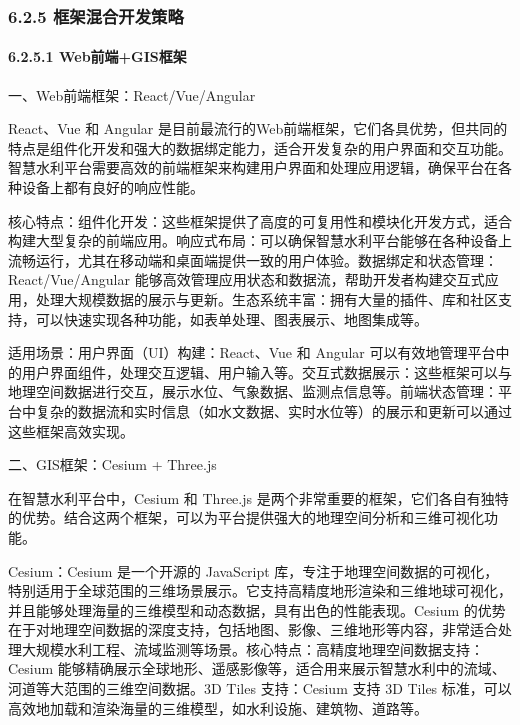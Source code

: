 \hypertarget{ux6846ux67b6ux6df7ux5408ux5f00ux53d1ux7b56ux7565}{%
\subsubsection{6.2.5 框架混合开发策略}\label{ux6846ux67b6ux6df7ux5408ux5f00ux53d1ux7b56ux7565}}

\hypertarget{webux524dux7aefgisux6846ux67b6}{%
\paragraph{6.2.5.1 Web前端+GIS框架}\label{webux524dux7aefgisux6846ux67b6}}

一、Web前端框架：React/Vue/Angular

React、Vue 和 Angular 是目前最流行的Web前端框架，它们各具优势，但共同的特点是组件化开发和强大的数据绑定能力，适合开发复杂的用户界面和交互功能。智慧水利平台需要高效的前端框架来构建用户界面和处理应用逻辑，确保平台在各种设备上都有良好的响应性能。

核心特点：组件化开发：这些框架提供了高度的可复用性和模块化开发方式，适合构建大型复杂的前端应用。响应式布局：可以确保智慧水利平台能够在各种设备上流畅运行，尤其在移动端和桌面端提供一致的用户体验。数据绑定和状态管理：React/Vue/Angular 能够高效管理应用状态和数据流，帮助开发者构建交互式应用，处理大规模数据的展示与更新。生态系统丰富：拥有大量的插件、库和社区支持，可以快速实现各种功能，如表单处理、图表展示、地图集成等。

适用场景：用户界面（UI）构建：React、Vue 和 Angular 可以有效地管理平台中的用户界面组件，处理交互逻辑、用户输入等。交互式数据展示：这些框架可以与地理空间数据进行交互，展示水位、气象数据、监测点信息等。前端状态管理：平台中复杂的数据流和实时信息（如水文数据、实时水位等）的展示和更新可以通过这些框架高效实现。

二、GIS框架：Cesium + Three.js

在智慧水利平台中，Cesium 和 Three.js 是两个非常重要的框架，它们各自有独特的优势。结合这两个框架，可以为平台提供强大的地理空间分析和三维可视化功能。

Cesium：Cesium 是一个开源的 JavaScript 库，专注于地理空间数据的可视化，特别适用于全球范围的三维场景展示。它支持高精度地形渲染和三维地球可视化，并且能够处理海量的三维模型和动态数据，具有出色的性能表现。Cesium 的优势在于对地理空间数据的深度支持，包括地图、影像、三维地形等内容，非常适合处理大规模水利工程、流域监测等场景。核心特点：高精度地理空间数据支持：Cesium 能够精确展示全球地形、遥感影像等，适合用来展示智慧水利中的流域、河道等大范围的三维空间数据。3D Tiles 支持：Cesium 支持 3D Tiles 标准，可以高效地加载和渲染海量的三维模型，如水利设施、建筑物、道路等。

